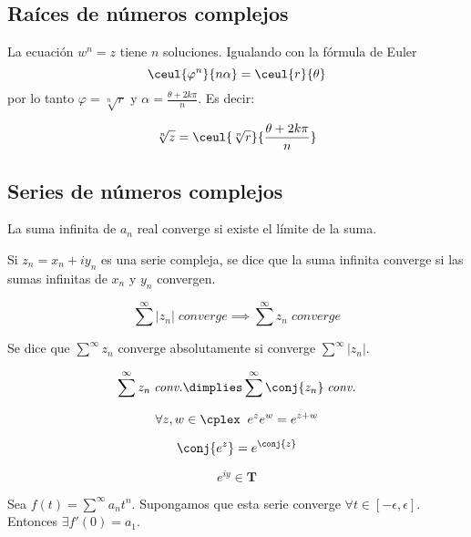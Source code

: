 \documentclass[nochap]{apuntes}
\begin{document}
\subsection{Raíces de números complejos}

La ecuación $w^n=z$ tiene $n$ soluciones. Igualando con la fórmula de Euler
\[\ceul{\varphi^n}{n\alpha}=\ceul{r}{\theta} \] por lo tanto $\varphi=\sqrt[n]{r}$ y $\alpha=\frac{\theta +2k\pi}{n}$. Es decir:

\[ \sqrt[n]{z}=\ceul{\sqrt[n]{r}}{\frac{\theta+2k\pi}{n}} \]

\subsection{Series de números complejos}

\begin{defn} La suma infinita de $a_n$ real converge si existe el límite de la suma.\end{defn}

\begin{defn} Si $z_n=x_n+iy_n$ es una serie compleja, se dice que la suma infinita converge si las sumas infinitas de $x_n$ y $y_n$ convergen.\end{defn}

\begin{lemma}\[ \sum^\infty |z_n|\; \textit{converge}\implies \sum^\infty z_n \;\textit{converge} \]\end{lemma}

\begin{defn}Se dice que $\sum^\infty z_n$ converge absolutamente si converge $\sum^\infty |z_n|$.\end{defn}

\begin{lemma}
\[ \sum^\infty z_n \; \textit{conv.} \dimplies \sum^\infty\conj{z_n} \; \textit{conv.} \]
\end{lemma}

\begin{theorem}
\[\forall z,w \in \cplex \;\; e^ze^w=e^{z+w} \]
\end{theorem}

\begin{lemma}
\[\conj{e^z}=e^{\conj{z}}\]
\end{lemma}

\begin{lemma}
\[ e^{iy} \in \mathbf{T} \]
\end{lemma}

\begin{lemma}Sea $f(t)=\sum^\infty a_n t^n$. Supongamos que esta serie converge $\forall t \in [-\epsilon, \epsilon]$. Entonces $\exists f'(0)=a_1$.\end{lemma}
\end{document}
